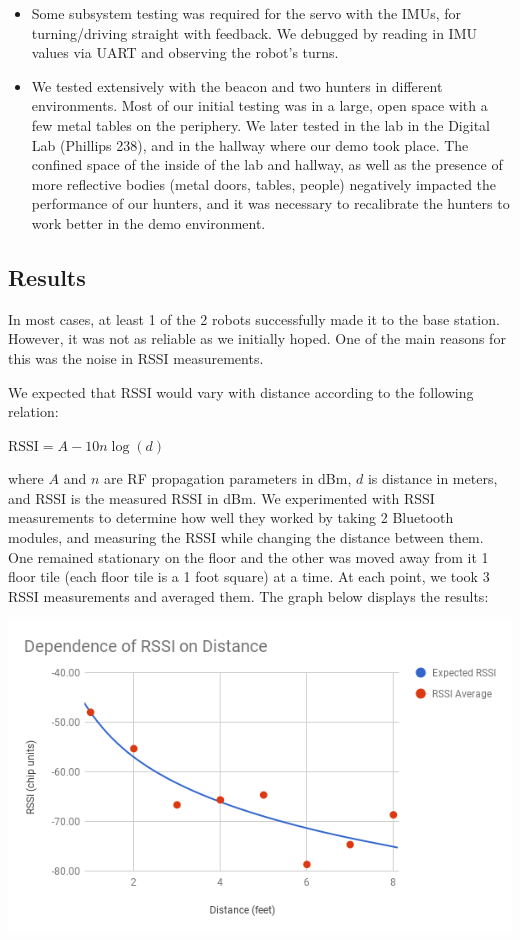 \documentclass[]{article}
\providecommand{\tightlist}{%
  \setlength{\itemsep}{0pt}\setlength{\parskip}{0pt}}
\begin{document}
\begin{itemize}
\tightlist
\item
  Some subsystem testing was required for the servo with the IMUs, for
  turning/driving straight with feedback. We debugged by reading in IMU
  values via UART and observing the robot's turns.
\item
  We tested extensively with the beacon and two hunters in different
  environments. Most of our initial testing was in a large, open space
  with a few metal tables on the periphery. We later tested in the lab
  in the Digital Lab (Phillips 238), and in the hallway where our demo
  took place. The confined space of the inside of the lab and hallway,
  as well as the presence of more reflective bodies (metal doors,
  tables, people) negatively impacted the performance of our hunters,
  and it was necessary to recalibrate the hunters to work better in the
  demo environment.
\end{itemize}

\hypertarget{results}{%
\subsection{Results}\label{results}}

In most cases, at least 1 of the 2 robots successfully made it to the
base station. However, it was not as reliable as we initially hoped. One
of the main reasons for this was the noise in RSSI measurements.

We expected that RSSI would vary with distance according to the
following relation:

\(\text{RSSI} = A - 10 n \log(d)\)

where \(A\) and \(n\) are RF propagation parameters in dBm, \(d\) is
distance in meters, and RSSI is the measured RSSI in dBm. \cite{5415423}
We experimented with RSSI measurements to determine how well they worked
by taking 2 Bluetooth modules, and measuring the RSSI while changing the
distance between them. One remained stationary on the floor and the
other was moved away from it 1 floor tile (each floor tile is a 1 foot
square) at a time. At each point, we took 3 RSSI measurements and
averaged them. The graph below displays the results:

\includegraphics{rssi-chart.png}
\end{document}
